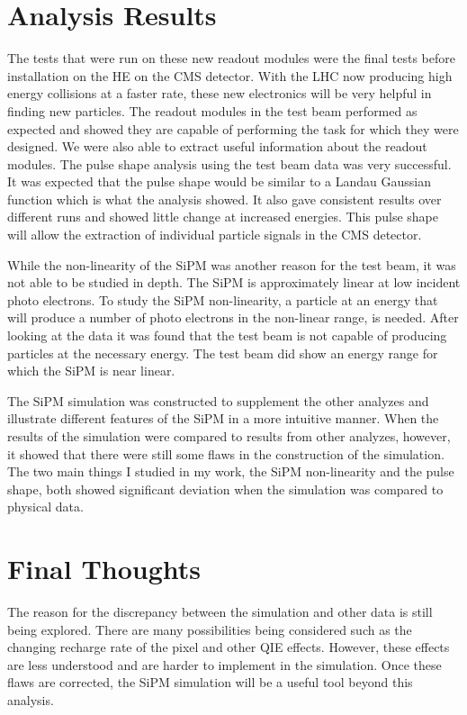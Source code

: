 \section{Analysis Results}

The tests that were run on these new readout modules were the final tests before installation on the HE on the CMS detector. With the LHC now producing high energy collisions at a faster rate, these new electronics will be very helpful in finding new particles. The readout modules in the test beam performed as expected and showed they are capable of performing the task for which they were designed. We were also able to extract useful information about the readout modules. The pulse shape analysis using the test beam data was very successful. It was expected that the pulse shape would be similar to a Landau Gaussian function which is what the analysis showed. It also gave consistent results over different runs and showed little change at increased energies. This pulse shape will allow the extraction of individual particle signals in the CMS detector. 

While the non-linearity of the SiPM was another reason for the test beam, it was not able to be studied in depth. The SiPM is approximately linear at low incident photo electrons. To study the SiPM non-linearity, a particle at an energy that will produce a number of photo electrons in the non-linear range, is needed. After looking at the data it was found that the test beam is not capable of producing particles at the necessary energy. The test beam did show an energy range for which the SiPM is near linear.

The SiPM simulation was constructed to supplement the other analyzes and illustrate different features of the SiPM in a more intuitive manner. When the results of the simulation were compared to results from other analyzes, however, it showed that there were still some flaws in the construction of the simulation. The two main things I studied in my work, the SiPM non-linearity and the pulse shape, both showed significant deviation when the simulation was compared to physical data. 

\section{Final Thoughts}

The reason for the discrepancy between the simulation and other data is still being explored. There are many possibilities being considered such as the changing recharge rate of the pixel and other QIE effects. However, these effects are less understood and are harder to implement in the simulation. Once these flaws are corrected, the SiPM simulation will be a useful tool beyond this analysis. 

